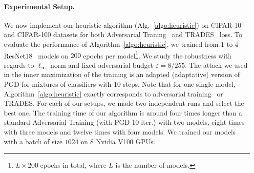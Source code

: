  

\paragraph{Experimental Setup.} We now implement our heuristic algorithm (Alg.~\ref{algo:heuristic}) on CIFAR-10 and CIFAR-100 datasets for both Adversarial Traning~\citep{madry2018towards} and TRADES~\citep{zhang2019theoretically} loss. To evaluate the performance of Algorithm~\ref{algo:heuristic}, we trained from $1$ to $4$ ResNet18~\citep{he2016deep} models on $200$ epochs per model\footnote{$L\times200$ epochs in total, where $L$ is the number of models.}. We study the robustness with regards to $\ell_\infty$ norm and fixed adversarial budget $\varepsilon=8/255$. The attack we used in the inner maximization of the training is an adapted (adaptative) version of PGD for mixtures of classifiers with $10$ steps. Note that for one single model, Algorithm~\ref{algo:heuristic} exactly corresponds to adversarial training~\citep{madry2018towards} or TRADES. For each of our setups, we made two independent runs and select the  best one. The training time of our algorithm is around four times longer than a standard Adversarial Training (with PGD 10 iter.) with two models, eight times with three models and twelve times with four models. We trained our models with a batch of size  $1024$ on $8$ Nvidia V100 GPUs. 

